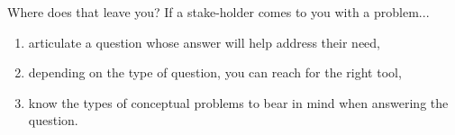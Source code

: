 \documentclass[11pt]{beamer}
\begin{document}
\begin{frame}[c]{Where does that leave you?}
If a stake-holder comes to you with a problem... 
\begin{enumerate}
  \pause \item articulate a question whose answer will help address their need, 
  \pause \item depending on the type of question, you can reach for the right tool, 
  \pause \item know the types of \alert{conceptual} problems to bear in mind when answering the question. 
\end{enumerate}
\end{frame}
\end{document}

